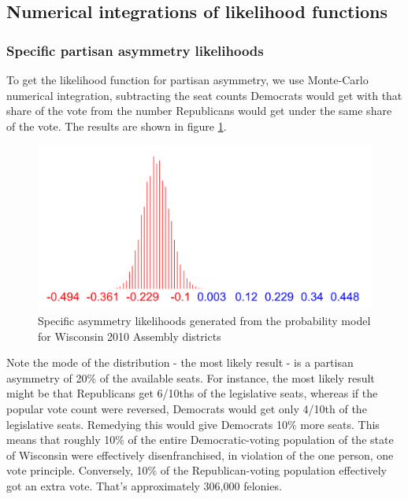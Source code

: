 \documentclass[preprint,12pt]{article}
\begin{document}
\subsection{Numerical integrations of likelihood functions}

\subsubsection{Specific partisan asymmetry likelihoods}
 
To get the likelihood function for partisan asymmetry, we use Monte-Carlo numerical integration, subtracting the seat counts Democrats would get with that share of the vote from the number Republicans would get under the same share of the vote. The results are shown in figure \ref{fig:LikelihoodsAsymmetry}.
 
\begin{figure}[htb!]
    \begin{center}
        \includegraphics[scale=0.5]{../Figures/WI2010/asymmetry_alt.png}
        \caption{Specific asymmetry likelihoods generated from the probability model for Wisconsin 2010 Assembly districts}\label{fig:LikelihoodsAsymmetry}
    \end{center}
\end{figure}
 
Note the mode of the distribution - the most likely result - is a partisan asymmetry of 20\% of the available seats.  For instance, the most likely result might be that Republicans get 6/10ths of the legislative seats, whereas if the popular vote count were reversed, Democrats would get only 4/10th of the legislative seats.  Remedying this would give Democrats 10\% more seats.  This means that roughly 10\% of the entire Democratic-voting population of the state of Wisconsin were effectively disenfranchised, in violation of the one person, one vote principle.  Conversely, 10\% of the Republican-voting population effectively got an extra vote.  That's approximately 306,000 felonies.
 
\end{document}

